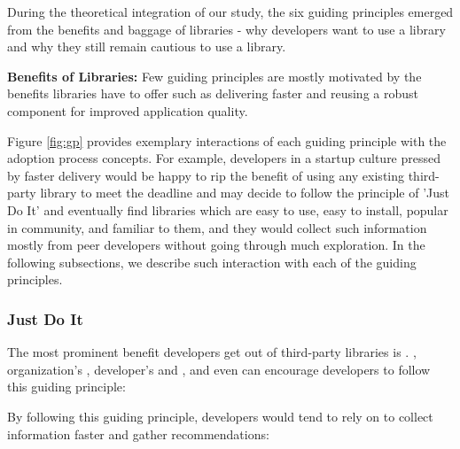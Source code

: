 During the theoretical integration of our study, the six guiding principles emerged from the benefits and baggage of libraries - why developers want to use a library and why they still remain cautious to use a library.

\begin{tcolorbox}[flushleft upper,boxrule=1pt,arc=0pt,left=0pt,right=0pt,top=0pt,bottom=0pt,colback=white,after=\ignorespacesafterend\par\noindent]
\textbf{Benefits of Libraries:} Few guiding principles are mostly motivated by the benefits libraries have to offer such as delivering faster and reusing a robust component for improved application quality.
\end{tcolorbox}

Figure \ref{fig:gp} provides exemplary interactions of each guiding principle with the adoption process concepts. For example, developers in a startup culture pressed by faster delivery would be happy to rip the benefit of using any existing third-party library to meet the deadline and may decide to follow the principle of 'Just Do It' and eventually find libraries which are easy to use, easy to install, popular in community, and familiar to them, and they would collect such information mostly from peer developers without going through much exploration. In the following subsections, we describe such interaction with each of the guiding principles.

\subsubsection{Just Do It} 
The most prominent benefit developers get out of third-party libraries is . , organization's , developer's  and , and even  can encourage developers to follow this guiding principle: 

By following this guiding principle, developers would tend to rely on  to collect information faster and gather recommendations: 

